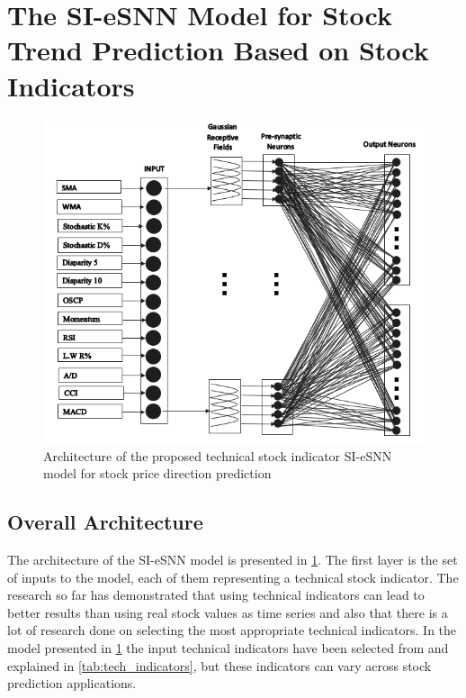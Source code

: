 \section{The SI-eSNN Model for Stock Trend Prediction Based on Stock Indicators}
\begin{figure}
	\centering
	\includegraphics[scale=0.5]{fig/snn/esnn_arch.PNG}
	\caption{Architecture of the proposed technical stock indicator SI-eSNN model for stock price direction prediction}
	\label{fig:esnn_arch_stock}
\end{figure}

\subsection{Overall Architecture}

The architecture of the SI-eSNN model is presented in \figurename \ref{fig:esnn_arch_stock}. The first layer is the set of inputs to the model, each of them representing a technical stock indicator. The research so far has demonstrated that using technical indicators can lead to better results than using real stock values as time series and also that there is a lot of research done on selecting the most appropriate technical indicators. In the model presented in
\figurename \ref{fig:esnn_arch_stock} the input technical indicators have been selected from \citep{patel2015predicting, kim2003financial, kara2011predicting} and explained in \tablename \ref{tab:tech_indicators}, but these indicators can vary across stock prediction applications.


